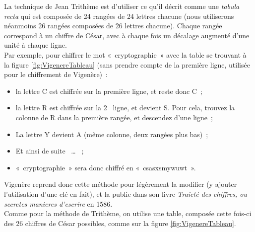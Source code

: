 La technique de Jean Trithème est d'utiliser ce qu'il décrit comme une
\emph{tabula recta} qui est composée de 24 rangées de 24
lettres chacune (nous utiliserons néanmoins 26 rangées composées
de 26 lettres chacune). 
Chaque rangée correspond à un chiffre de César,
avec à chaque fois un décalage augmenté d'une unité à chaque ligne. \\

Par exemple, pour chiffrer le mot «~cryptographie~» avec la table se
trouvant à la figure \ref{fig:VigenereTableau} (sans prendre
compte de la première ligne, utilisée pour le chiffrement de
Vigenère)~: 
\begin{itemize}
  \item la lettre C est chiffrée sur la première ligne, et reste
    donc C~;
  \item la lettre R est chiffrée sur la 2\ieme~ ligne, et devient
    S. Pour cela, trouvez la colonne de R dans la première rangée, et
    descendez d'une ligne~;
  \item La lettre Y devient A (même colonne, deux rangées plus bas)~;
  \item Et ainsi de suite ~\dots ~ ;
  \item «~cryptographie~» sera donc chiffré en «~csasxsmywuwt~».
\end{itemize}


Vigenère reprend donc cette méthode pour légèrement la modifier (y
ajouter l'utilisation d'une clé en fait), et la publie dans son livre
\emph{Traicté des chiffres, ou secretes
  manieres d'escrire} en 1586. \\

Comme pour la méthode de Trithème, on utilise une table, composée
cette fois-ci des 26 chiffres de César possibles, comme sur la figure
\ref{fig:VigenereTableau}. \\


